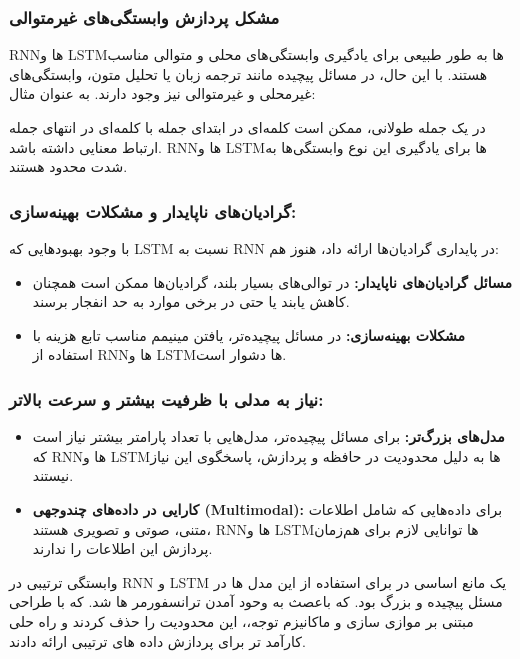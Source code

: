\subsubsection{مشکل پردازش وابستگی‌های غیرمتوالی}

RNNها و LSTMها به طور طبیعی برای یادگیری وابستگی‌های محلی و متوالی مناسب هستند. با این حال، در مسائل پیچیده مانند ترجمه زبان یا تحلیل متون، وابستگی‌های غیرمحلی و غیرمتوالی نیز وجود دارند. به عنوان مثال:

در یک جمله طولانی، ممکن است کلمه‌ای در ابتدای جمله با کلمه‌ای در انتهای جمله ارتباط معنایی داشته باشد. RNNها و LSTMها برای یادگیری این نوع وابستگی‌ها به شدت محدود هستند.


\subsubsection{گرادیان‌های ناپایدار و مشکلات بهینه‌سازی:}

با وجود بهبودهایی که LSTM نسبت به RNN در پایداری گرادیان‌ها ارائه داد، هنوز هم:
\begin{itemize}
	\item \textbf{مسائل گرادیان‌های ناپایدار:} در توالی‌های بسیار بلند، گرادیان‌ها ممکن است همچنان کاهش یابند یا حتی در برخی موارد به حد انفجار برسند.
	\item \textbf{مشکلات بهینه‌سازی:} در مسائل پیچیده‌تر، یافتن مینیمم مناسب تابع هزینه با استفاده از RNNها و LSTMها دشوار است.
\end{itemize}

\subsubsection{نیاز به مدلی با ظرفیت بیشتر و سرعت بالاتر:}

\begin{itemize}
	\item \textbf{مدل‌های بزرگ‌تر:} برای مسائل پیچیده‌تر، مدل‌هایی با تعداد پارامتر بیشتر نیاز است که RNNها و LSTMها به دلیل محدودیت در حافظه و پردازش، پاسخگوی این نیاز نیستند.
	\item \textbf{کارایی در داده‌های چندوجهی (Multimodal):} برای داده‌هایی که شامل اطلاعات متنی، صوتی و تصویری هستند، RNNها و LSTMها توانایی لازم برای هم‌زمان پردازش این اطلاعات را ندارند.
\end{itemize}
	
وابستگی ترتیبی در RNN  و LSTM  یک مانع اساسی در برای استفاده از این مدل ها در مسئل پیچیده و بزرگ بود. که باعصث به وحود آمدن ترانسفورمر ها شد. 
که با طراحی مبتنی بر  موازی سازی و ماکانیزم توجه،، این محدودیت را حذف کردند و راه حلی کارآمد تر برای پردازش داده های ترتیبی ارائه دادند.

	



